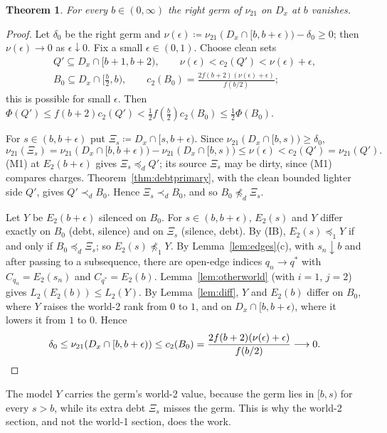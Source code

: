\documentclass[11pt]{article}
\newtheorem{theorem}{Theorem}
\theoremstyle{definition}\newtheorem{definition}[theorem]{Definition}
\theoremstyle{remark}\newtheorem{remark}[theorem]{Remark}
\newcommand{\Band}{\Xi}
\begin{document}
\begin{theorem}\label{thm:rightgerm}
For every $b\in(0,\infty)$ the right germ of $\nu_{21}$ on $D_x$ at $b$
vanishes.
\end{theorem}
\begin{proof}
Let $\delta_0$ be the right germ and $\nu(\epsilon)\coloneqq
\nu_{21}(D_x\cap[b,b+\epsilon))-\delta_0\ge0$; then $\nu(\epsilon)\to0$ as
$\epsilon\downarrow0$. Fix a small $\epsilon\in(0,1)$. Choose clean sets
\begin{gather*}
 Q'\subseteq D_x\cap[b+1,b+2),\qquad \nu(\epsilon)<c_2(Q')<\nu(\epsilon)+
 \epsilon,\\
 B_0\subseteq D_x\cap[\tfrac b2,b),\qquad c_2(B_0)=\frac{2f(b+2)
 (\nu(\epsilon)+\epsilon)}{f(b/2)};
\end{gather*}
this is possible for small $\epsilon$. Then $\Phi(Q')\le f(b+2)c_2(Q')<
\frac12f(\frac b2)c_2(B_0)\le\frac12\Phi(B_0)$.

For $s\in(b,b+\epsilon)$ put $\Band_s\coloneqq D_x\cap[s,b+\epsilon)$. Since
$\nu_{21}(D_x\cap[b,s))\ge\delta_0$,
\[
 \nu_{21}(\Band_s)=\nu_{21}(D_x\cap[b,b+\epsilon))-\nu_{21}(D_x\cap[b,s))
 \le\nu(\epsilon)<c_2(Q')=\nu_{21}(Q').
\]
(M1) at $E_2(b+\epsilon)$ gives $\Band_s\preceq_dQ'$; its source $\Band_s$
may be dirty, since (M1) compares charges. Theorem~\ref{thm:debtprimary},
with the clean bounded lighter side $Q'$, gives $Q'\prec_dB_0$. Hence
$\Band_s\prec_dB_0$, and so $B_0\not\preceq_d\Band_s$.

Let $Y$ be $E_2(b+\epsilon)$ silenced on $B_0$. For $s\in(b,b+\epsilon)$,
$E_2(s)$ and $Y$ differ exactly on $B_0$ (debt, silence) and on $\Band_s$
(silence, debt). By (IB), $E_2(s)\preceq_1Y$ if and only if
$B_0\preceq_d\Band_s$; so $E_2(s)\not\preceq_1Y$. By
Lemma~\ref{lem:edges}(c), with $s_n\downarrow b$ and after passing to a
subsequence, there are open-edge indices
$q_n\to q^*$ with $C_{q_n}=E_2(s_n)$ and $C_{q^*}=E_2(b)$.
Lemma~\ref{lem:otherworld} (with $i=1$, $j=2$) gives
$L_2(E_2(b))\le L_2(Y)$. By Lemma~\ref{lem:diff}, $Y$ and $E_2(b)$ differ on
$B_0$, where $Y$ raises the world-2 rank from $0$ to $1$, and on
$D_x\cap[b,b+\epsilon)$, where it lowers it from $1$ to $0$. Hence
\[
 \delta_0\le\nu_{21}(D_x\cap[b,b+\epsilon))\le c_2(B_0)
 =\frac{2f(b+2)(\nu(\epsilon)+\epsilon)}{f(b/2)}\longrightarrow0 .\qedhere
\]
\end{proof}

The model $Y$ carries the germ's world-2 value, because the germ lies in
$[b,s)$ for every $s>b$, while its extra debt $\Band_s$ misses the germ. This
is why the world-2 section, and not the world-1 section, does the work.
\end{document}
